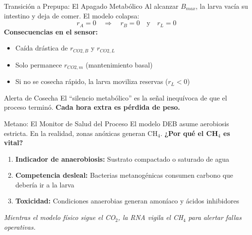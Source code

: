 \documentclass[aspectratio=169, 11pt]{beamer}
\begin{document}
\begin{frame}{Transición a Prepupa: El Apagado Metabólico}
    Al alcanzar $B_{max}$, la larva vacía su intestino y deja de comer. El modelo colapsa:
    $$ r_A = 0 \quad \Rightarrow \quad r_B = 0 \quad \text{y} \quad r_L = 0 $$
    \vspace{0.3cm}
    \textbf{Consecuencias en el sensor:}
    \begin{itemize}
        \item Caída drástica de $r_{CO2,B}$ y $r_{CO2,L}$
        \item Solo permanece $r_{CO2,m}$ (mantenimiento basal)
        \item Si no se cosecha rápido, la larva moviliza reservas ($r_L < 0$)
    \end{itemize}
    \vspace{0.2cm}
    \begin{alertblock}{Alerta de Cosecha}
        El ``silencio metabólico'' es la señal inequívoca de que el proceso terminó. \textbf{Cada hora extra es pérdida de peso.}
    \end{alertblock}
\end{frame}

\begin{frame}{Metano: El Monitor de Salud del Proceso}
    El modelo DEB asume aerobiosis estricta. En la realidad, zonas anóxicas generan CH$_4$.
    \vspace{0.3cm}
    \textbf{¿Por qué el CH$_4$ es vital?}
    \begin{enumerate}
        \item \textbf{Indicador de anaerobiosis:} Sustrato compactado o saturado de agua
        \item \textbf{Competencia desleal:} Bacterias metanogénicas consumen carbono que debería ir a la larva
        \item \textbf{Toxicidad:} Condiciones anaerobias generan amoníaco y ácidos inhibidores
    \end{enumerate}
    \vspace{0.2cm}
    \centering
    \textit{Mientras el modelo físico sigue el CO$_2$, la RNA vigila el CH$_4$ para alertar fallas operativas.}
\end{frame}

\end{document}
